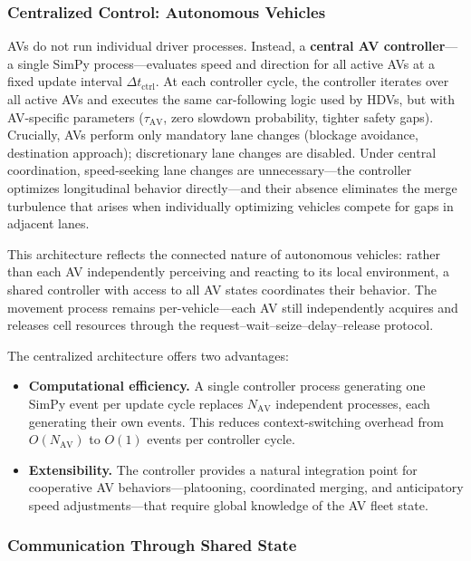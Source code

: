 \documentclass[review,authoryear]{elsarticle}
\begin{document}
\subsubsection{Centralized Control: Autonomous Vehicles}
\label{sec:av_controller}

AVs do not run individual driver processes. Instead, a \textbf{central AV controller}---a single SimPy process---evaluates speed and direction for all active AVs at a fixed update interval $\Delta t_{\text{ctrl}}$. At each controller cycle, the controller iterates over all active AVs and executes the same car-following logic used by HDVs, but with AV-specific parameters ($\tau_{\text{AV}}$, zero slowdown probability, tighter safety gaps). Crucially, AVs perform only mandatory lane changes (blockage avoidance, destination approach); discretionary lane changes are disabled. Under central coordination, speed-seeking lane changes are unnecessary---the controller optimizes longitudinal behavior directly---and their absence eliminates the merge turbulence that arises when individually optimizing vehicles compete for gaps in adjacent lanes.

This architecture reflects the connected nature of autonomous vehicles: rather than each AV independently perceiving and reacting to its local environment, a shared controller with access to all AV states coordinates their behavior. The movement process remains per-vehicle---each AV still independently acquires and releases cell resources through the request--wait--seize--delay--release protocol.

The centralized architecture offers two advantages:
\begin{itemize}
    \item \textbf{Computational efficiency.} A single controller process generating one SimPy event per update cycle replaces $N_{\text{AV}}$ independent processes, each generating their own events. This reduces context-switching overhead from $O(N_{\text{AV}})$ to $O(1)$ events per controller cycle.
    \item \textbf{Extensibility.} The controller provides a natural integration point for cooperative AV behaviors---platooning, coordinated merging, and anticipatory speed adjustments---that require global knowledge of the AV fleet state.
\end{itemize}

\subsubsection{Communication Through Shared State}
\end{document}
